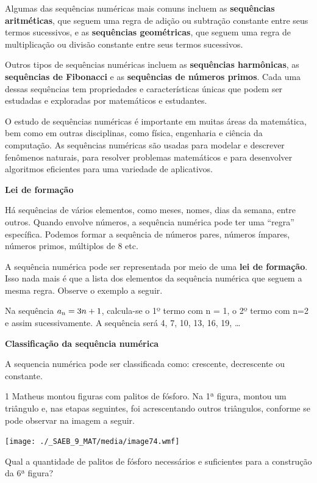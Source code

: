 {{{\begin{escolha}
{Algumas das sequências numéricas mais comuns incluem as \textbf{sequências
aritméticas}, que seguem uma regra de adição ou subtração constante entre
seus termos sucessivos, e as \textbf{sequências geométricas}, que seguem uma
regra de multiplicação ou divisão constante entre seus termos
sucessivos.

Outros tipos de sequências numéricas incluem as \textbf{sequências harmônicas},
as \textbf{sequências de Fibonacci} e as \textbf{sequências de números 
primos}. Cada uma dessas sequências tem propriedades e características 
únicas que podem ser estudadas e exploradas por matemáticos e estudantes.

O estudo de sequências numéricas é importante em muitas áreas da
matemática, bem como em outras disciplinas, como física, engenharia e
ciência da computação. As sequências numéricas são usadas para modelar e
descrever fenômenos naturais, para resolver problemas matemáticos e para
desenvolver algoritmos eficientes para uma variedade de aplicativos.

\textbf{Lei de formação}

Há sequências de vários elementos, como meses, nomes, dias da
semana, entre outros. Quando envolve números, a sequência numérica pode
ter uma ``regra'' específica. Podemos formar a sequência de números
pares, números ímpares, números primos, múltiplos de 8 etc.

A sequência numérica pode ser representada por meio de uma \textbf{lei de
formação}. Isso nada mais é que a lista dos elementos da sequência
numérica que seguem a mesma regra. Observe o exemplo a seguir.

Na sequência $a\textsubscript{n}= 3n + 1$, calcula-se o 1º termo com n = 1,
o 2º termo com n=2 e assim sucessivamente. A sequência será 4, 7, 10, 13, 16, 19, \ldots{}

\textbf{Classificação da sequência numérica}

A sequencia numérica pode ser classificada como: crescente, decrescente
ou constante.}


\num{1} Matheus montou figuras com palitos de fósforo. Na 1ª figura, montou
um triângulo e, nas etapas seguintes, foi acrescentando outros triângulos,
conforme se pode observar na imagem a seguir.

\texttt{[image: ./\_SAEB\_9\_MAT/media/image74.wmf]}

Qual a quantidade de palitos de fósforo necessários e suficientes para a
construção da 6ª figura?


\end{escolha}}}}
